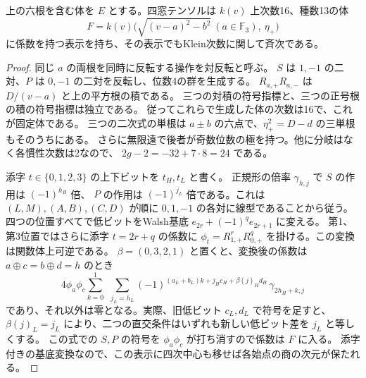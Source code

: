 \begin{proposition}\label{prop:rank-fifteen-genus-thirteen-window}
上の六根を含む体を $E$ とする。四窓テンソルは $k(v)$ 上次数16、種数13の体
\[
 F=k(v)\big(\sqrt{(v-a)^2-b^2}\ (a\in\mathbb F_3),\ \eta_+\big)
\]
に係数を持つ表示を持ち、その表示でもKlein次数に関して斉次である。
\end{proposition}
\begin{proof}
同じ $a$ の両根を同時に反転する操作を対反転と呼ぶ。
$S$ は $1,-1$ の二対、$P$ は $0,-1$ の二対を反転し、位数4の群を生成する。
$R_{a,+}R_{a,-}$ は $D/(v-a)$ と上の平方根の積である。
三つの対積の符号指標と、三つの正号根の積の符号指標は独立である。
従ってこれらで生成した体の次数は16で、これが固定体である。
三つの二次式の単根は $a\pm b$ の六点で、$\eta_+^2=D-d$ の三単根もそのうちにある。
さらに無限遠で後者が奇数位数の極を持つ。他に分岐はなく各慣性次数は2なので、
$2g-2=-32+7\cdot8=24$ である。

添字 $t\in\{0,1,2,3\}$ の上下ビットを $t_H,t_L$ と書く。
正規形の倍率 $\gamma_{h,j}$ で $S$ の作用は $(-1)^{h_H}$ 倍、
$P$ の作用は $(-1)^{j_L}$ 倍である。これは $(L,M),(A,B),(C,D)$ が順に
$0,1,-1$ の各対に線型であることから従う。
四つの位置すべてで低ビットをWalsh基底 $e_{2r}+(-1)^q e_{2r+1}$ に変える。
第1、第3位置ではさらに添字 $t=2r+q$ の係数に
$\phi_t=R_{1,+}^{r}R_{0,+}^{q}$ を掛ける。この変換は関数体上可逆である。
$\beta=(0,3,2,1)$ と置くと、変換後の係数は
$a\mathbin\oplus c=b\mathbin\oplus d=h$ のとき
\[
 4\phi_a\phi_c\sum_{k=0}^1\ \,\sum_{j_L=h_L}
 (-1)^{(a_L+b_L)k+j_Hc_H+\beta(j)_Hd_H}\,
 \gamma_{2h_H+k,j}
\]
であり、それ以外は零となる。実際、旧低ビット $c_L,d_L$ で符号を足すと、
$\beta(j)_L=j_L$ により、二つの直交条件はいずれも新しい低ビット差を $j_L$ と等しくする。
この式での $S,P$ の符号を $\phi_a\phi_c$ が打ち消すので係数は $F$ に入る。
添字付きの基底変換なので、この表示に四次中心も移せば各始点の商の次元が保たれる。
\end{proof}

